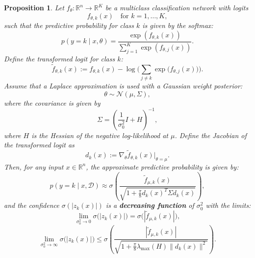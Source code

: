 \documentclass{article}
\newtheorem{prop}{Proposition}
\begin{document}
\begin{prop}
Let $f_\theta: \mathbb{R}^n \to \mathbb{R}^K$ be a multiclass classification network with logits 
\[
f_{\theta,k}(x) \quad \text{for } k=1,\dots,K,
\]
such that the predictive probability for class $k$ is given by the softmax:
\[
p(y=k \mid x,\theta) = \frac{\exp(f_{\theta,k}(x))}{\sum_{j=1}^K \exp(f_{\theta,j}(x))}.
\]
Define the transformed logit for class $k$:
\[
\tilde{f}_{\theta,k}(x) := f_{\theta,k}(x) - \log\Biggl(\sum_{j\neq k} \exp\bigl(f_{\theta,j}(x)\bigr)\Biggr).
\]
Assume that a Laplace approximation is used with a Gaussian weight posterior:
\[
\theta \sim \mathcal{N}(\mu,\Sigma),
\]
where the covariance is given by
\[
\Sigma = \left(\frac{1}{\sigma_0^2}I + H \right)^{-1},
\]
where $H$ is the Hessian of the negative log-likelihood at $\mu$. Define the Jacobian of the transformed logit as
\[
d_k(x) := \nabla_\theta \tilde{f}_{\theta,k}(x) \Big|_{\theta=\mu}.
\]
Then, for any input $x \in \mathbb{R}^n$, the approximate predictive probability is given by:
\[
p(y=k \mid x,\mathcal{D}) \approx \sigma\!\left( \frac{\tilde{f}_{\mu,k}(x)}{\sqrt{1+\frac{\pi}{8} d_k(x)^T \Sigma d_k(x)}} \right),
\]
and the confidence $\sigma(|z_k(x)|)$ is a \textbf{decreasing function} of $\sigma_0^2$ with the limits:
\[
\lim_{\sigma_0^2 \to 0} \sigma\bigl(|z_k(x)|\bigr) = \sigma\bigl(|\tilde{f}_{\mu,k}(x)|\bigr),
\]
\[
\lim_{\sigma_0^2 \to \infty} \sigma\bigl(|z_k(x)|\bigr) \leq \sigma\!\left( \frac{|\tilde{f}_{\mu,k}(x)|}{\sqrt{1+\frac{\pi}{8} \lambda_{\max}(H) \|d_k(x)\|^2}} \right).
\]
\end{prop}
\end{document}

